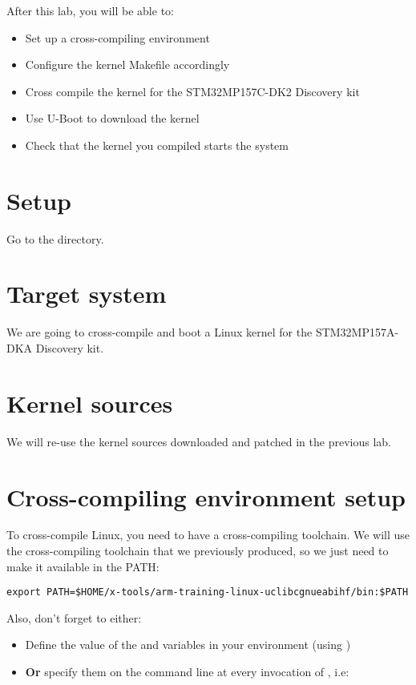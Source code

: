 
After this lab, you will be able to:
\begin{itemize}
\item Set up a cross-compiling environment
\item Configure the kernel Makefile accordingly
\item Cross compile the kernel for the STM32MP157C-DK2 Discovery kit
\item Use U-Boot to download the kernel
\item Check that the kernel you compiled starts the system
\end{itemize}

\section{Setup}

Go to the  directory.

\section{Target system}

We are going to cross-compile and boot a Linux kernel for the
STM32MP157A-DKA Discovery kit.

\section{Kernel sources}

We will re-use the kernel sources downloaded and patched in the
previous lab.

\section{Cross-compiling environment setup}

To cross-compile Linux, you need to have a cross-compiling
toolchain. We will use the cross-compiling toolchain that we
previously produced, so we just need to make it available in the PATH:

\begin{verbatim}
export PATH=$HOME/x-tools/arm-training-linux-uclibcgnueabihf/bin:$PATH
\end{verbatim}

Also, don't forget to either:

\begin{itemize}
\item Define the value of the  and 
  variables in your environment (using )
\item {\bf Or} specify them on the command line at every invocation of
  , i.e: 
\end{itemize}

